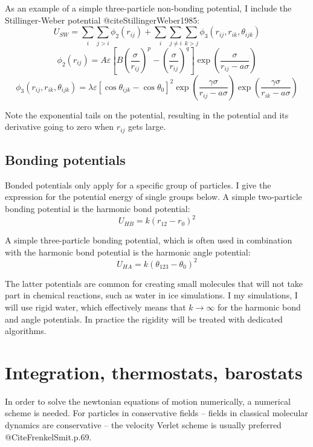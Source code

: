 As an example of a simple three-particle non-bonding potential, I include the Stillinger-Weber potential @citeStillingerWeber1985:
\begin{equation}
	U_{SW} = \sum_i \sum_{j>i} \phi_2(r_{ij}) + \sum_i \sum_{j\neq i} \sum_{k>j} \phi_3(r_{ij}, r_{ik}, \theta_{ijk})
\end{equation}
\begin{equation}
	\phi_2(r_{ij}) = A\varepsilon\left[ B \left( \frac{\sigma}{r_{ij}}\right)^p-\left(\frac{\sigma}{r_{ij}}\right)^q\right]\exp\left(\frac{\sigma}{r_{ij}-a\sigma}\right)
\end{equation}
\begin{equation}
	\phi_3(r_{ij}, r_{ik}, \theta_{ijk}) = \lambda\varepsilon\left[ \cos{\theta_{ijk}} - \cos{\theta_0}\right]^2 \exp\left( \frac{\gamma\sigma}{r_{ij}-a\sigma}\right) \exp\left(\frac{\gamma \sigma}{r_{ik}-a\sigma} \right)
\end{equation}

Note the exponential tails on the potential, resulting in the potential and its derivative going to zero when $r_{ij}$ gets large.

\subsection{Bonding potentials}
Bonded potentials only apply for a specific group of particles. I give the expression for the potential energy of single groups below.
A simple two-particle bonding potential is the harmonic bond potential:
\begin{equation}
	U_{HB} = k(r_{12} - r_0)^2
\end{equation}

A simple three-particle bonding potential, which is often used in combination with the harmonic bond potential is the harmonic angle potential:
\begin{equation}
	U_{HA} = k(\theta_{123} - \theta_0)^2
\end{equation}

The latter potentials are common for creating small molecules that will not take part in chemical reactions, such as water in ice simulations. I my simulations, I will use rigid water, which effectively means that $k\to\infty$ for the harmonic bond and angle potentials. In practice the rigidity will be treated with dedicated algorithms.

\section{Integration, thermostats, barostats}
In order to solve the newtonian equations of motion numerically, a numerical scheme is needed. For particles in conservative fields -- fields in classical molecular dynamics are conservative -- the velocity Verlet scheme is usually preferred @CiteFrenkelSmit.p.69. 

